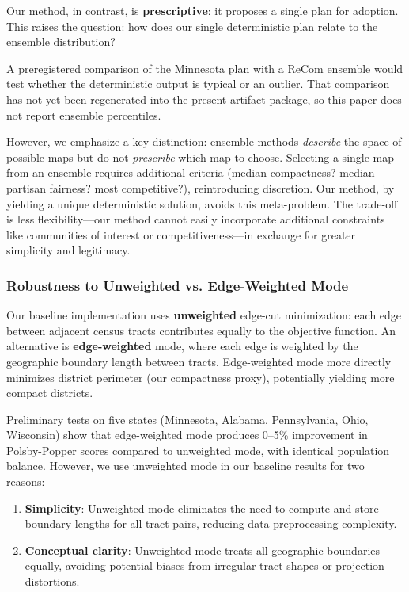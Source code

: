 Our method, in contrast, is \textbf{prescriptive}: it proposes a single plan for adoption. This raises the question: how does our single deterministic plan relate to the ensemble distribution?

A preregistered comparison of the Minnesota plan with a ReCom ensemble would
test whether the deterministic output is typical or an outlier. That comparison
has not yet been regenerated into the present artifact package, so this paper
does not report ensemble percentiles.

However, we emphasize a key distinction: ensemble methods \textit{describe} the space of possible maps but do not \textit{prescribe} which map to choose. Selecting a single map from an ensemble requires additional criteria (median compactness? median partisan fairness? most competitive?), reintroducing discretion. Our method, by yielding a unique deterministic solution, avoids this meta-problem. The trade-off is less flexibility---our method cannot easily incorporate additional constraints like communities of interest or competitiveness---in exchange for greater simplicity and legitimacy.

\subsubsection{Robustness to Unweighted vs. Edge-Weighted Mode}
\label{sec:edge-weighted-robustness}

Our baseline implementation uses \textbf{unweighted} edge-cut minimization: each edge between adjacent census tracts contributes equally to the objective function. An alternative is \textbf{edge-weighted} mode, where each edge is weighted by the geographic boundary length between tracts. Edge-weighted mode more directly minimizes district perimeter (our compactness proxy), potentially yielding more compact districts.

Preliminary tests on five states (Minnesota, Alabama, Pennsylvania, Ohio, Wisconsin) show that edge-weighted mode produces 0--5\% improvement in Polsby-Popper scores compared to unweighted mode, with identical population balance. However, we use unweighted mode in our baseline results for two reasons:

\begin{enumerate}
    \item \textbf{Simplicity}: Unweighted mode eliminates the need to compute and store boundary lengths for all tract pairs, reducing data preprocessing complexity.

    \item \textbf{Conceptual clarity}: Unweighted mode treats all geographic boundaries equally, avoiding potential biases from irregular tract shapes or projection distortions.
\end{enumerate}


